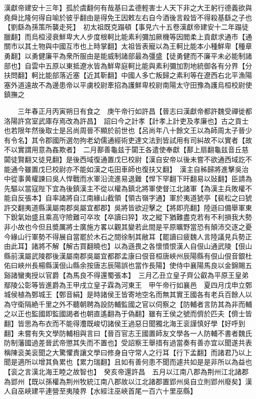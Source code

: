 漢獻帝建安十三年】孤於虞翻何有哉基曰孟德輕害士人天下非之大王躬行德義欲與堯舜比隆何得自喻於彼乎翻由是得免王因敕左右自今酒後言殺皆不得殺基繇之子也【劉繇為孫策所襲走死】　初太祖既克蹋頓【事見六十五卷漢獻帝建安十二年蹋徒臘翻】而烏桓浸衰鮮卑大人步度根軻比能素利彌加厥機等因閻柔上貢獻求通市【通關市以其土物與中國互市也上時掌翻】太祖皆表寵以為王軻比能本小種鮮卑【種章勇翻】以勇健廉平為衆所服由是能威制諸部最為彊盛【徒勇健而不廉平未必能制諸部也】自雲中五原以東抵遼水皆為鮮卑庭軻比能與素利彌加割地統御各有分界【分扶問翻】軻比能部落近塞【近其靳翻】中國人多亡叛歸之素利等在遼西右北平漁陽塞外道遠故不為邊患帝以平虜校尉牽招為護鮮卑校尉南陽太守田豫為護烏桓校尉使鎮撫之

　　三年春正月丙寅朔日有食之　庚午帝行如許昌【晉志曰漢獻帝都許魏受禪徙都洛陽許宫室武庫存焉改為許昌】　詔曰今之計孝【計孝上計吏及孝廉也】古之貢士也若限年然後取士是呂尚周晉不顯於前世也【呂尚年八十餘文王以為師周太子晉少有令名】其令郡國所選勿拘老幼儒通經術吏達文法到皆試用有司糾故不以實者【故不以實謂用意為姦欺者】　二月鄯善龜兹于闐王各遣使奉獻【鄯上扇翻龜兹音丘慈闐徒賢翻又徒見翻】是後西域復通置戊巳校尉【漢自安帝以後未嘗不欲通西域訖不能通今雖置戊巳校尉亦不能如漢之屯田車師也復扶又翻】　漢主自秭歸將進擊吳治中從事黄權諫曰吳人悍戰而水軍沿流進易退難【悍下罕翻下旰翻易以䜴翻】臣請為先驅以當寇陛下宜為後鎮漢主不從以權為鎮北將軍使督江北諸軍【為漢主兵敗權不能自反張本】自率諸將自江南緣山截領【領古嶺字通】軍於夷道猇亭【裴松之曰猇許交翻夷道縣漢屬南郡吳屬宜都郡】吳將皆欲迎擊之【將即亮翻】陸遜曰備舉軍東下銳氣始盛且乘高守險難可卒攻【卒讀曰猝】攻之縱下猶難盡克若有不利損我大勢非小故也今但且奬厲將士廣施方畧以觀其變若此間是平原曠野當恐有顛沛交逐之憂今緣山行軍勢不得展自當罷於木石之間徐制其敝耳【罷讀曰疲魏人言陸議見兵勢正由此耳】諸將不解【解古買翻曉也】以為遜畏之各懷憤恨漢人自佷山通武陵【佷山縣前漢屬武陵郡後漢屬南郡吳屬宜都郡孟康曰佷音桓唐峽州辰陽縣有佷山佷音銀杜佑曰峽州長楊縣漢佷山縣余按唐志辰陽誤也當作長陽】使侍中襄陽馬良以金錦賜五谿諸蠻夷授以官爵【為馬良不得還蜀張本】　三月乙丑立皇子齊公叡為平原王皇弟鄢陵公彰等皆進爵為王甲戌立皇子霖為河東王　甲午帝行如襄邑　夏四月戊申立鄄城侯植為鄄城王【鄄音絹】是時諸侯王皆寄地空名而無其實王國各有老兵百餘人以為守衛隔絶千里之外不聽朝聘為設防輔監國之官以伺察之【防輔者言防其為非而輔之以正也監國即監國謁者也朝直遙翻為于偽翻】雖有王侯之號而儕於匹夫【儕士皆翻】皆思為布衣而不能得灋既峻切諸侯王過惡日聞獨北海王衮謹慎好學【好呼到翻】未嘗有失文學防輔相與言曰【晉百官志王國置師友文學各一人防輔不書者魏氏防制藩國過差晉武帝懲其失而不置也】受詔察王舉措有過當奏有善亦宜以聞遂共表稱陳衮美衮聞之大驚懼責讓文學曰修身自守常人之行耳【行下孟翻】而諸君乃以上聞是適所以增其負累也【累力瑞翻】且如有善何患不聞而遽共如是是非所以為益也【衮之言漢北海王睦之故智也】　癸亥帝還許昌　五月以江南八郡為荆州江北諸郡為郢州【既以孫權為荆州牧統江南八郡故以江北諸郡置郢州吳自立則郢州廢矣】漢人自巫峽建平連營至夷陵界【水經注巫峽首尾一百六十里巫縣】

